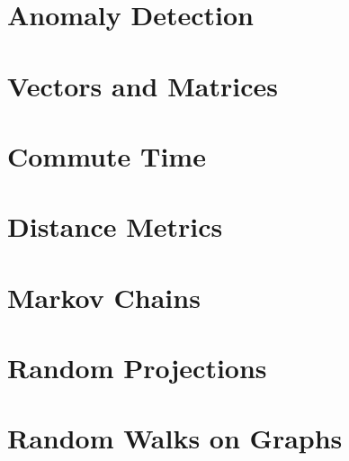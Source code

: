 \section{Anomaly Detection}
\label{anomalyDetection}


\section{Vectors and Matrices}
\label{vectorsAndMatrices}


\section{Commute Time}
\label{commuteTime}


\section{Distance Metrics}
\label{distanceMetrics}


\section{Markov Chains}
\label{markovChains}


\section{Random Projections}
\label{randomProjections}


\section{Random Walks on Graphs}
\label{randomWalks}



